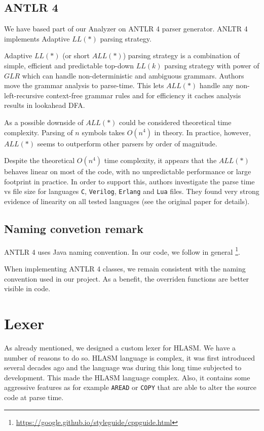 \subsection{ANTLR 4}
We have based part of our Analyzer on ANTLR 4 parser generator. ANLTR 4 implements Adaptive $LL(*)$ \cite{parr2014adaptive} parsing strategy.

Adaptive $LL(*)$ (or short $ALL(*)$) parsing strategy is a combination of simple, efficient and predictable top-down $LL(k)$ parsing strategy with power of $GLR$ which can handle non-deterministic and ambiguous grammars. 
Authors move the grammar analysis to parse-time. This lets $ALL(*)$ handle any non-left-recursive context-free grammar rules and for efficiency it caches analysis results in lookahead DFA.

As a possible downside of $ALL(*)$ could be considered theoretical time complexity. Parsing of $n$ symbols takes $O(n^4)$ in theory. In practice, however, $ALL(*)$ seems to outperform other parsers by order of magnitude.

Despite the theoretical $O(n^4)$ time complexity, it appears that the $ALL(*)$ behaves linear on most of the code, with no unpredictable performance or large footprint in practice. In order to support this, authors investigate the parse time vs file size for languages \texttt{C}, \texttt{Verilog}, \texttt{Erlang} and \texttt{Lua} files. They found very strong evidence of linearity on all tested languages (see the original paper for details).

\subsection{Naming convetion remark}
ANTLR 4 uses Java naming convention. In our code, we follow in general \footnote{\url{https://google.github.io/styleguide/cppguide.html}}. 

When implementing ANTLR 4 classes, we remain consistent with the naming convention used in our project. As a benefit, the overriden functions are better visible in code.

\section{Lexer}

As already mentioned, we designed a custom lexer for HLASM. We have a number of reasons to do so. HLASM language is complex, it was first introduced several decades ago and the language was during this long time subjected to development. This made the HLASM language complex. Also, it contains some aggressive features as for example \texttt{AREAD} or \texttt{COPY} that are able to alter the source code at parse time.

